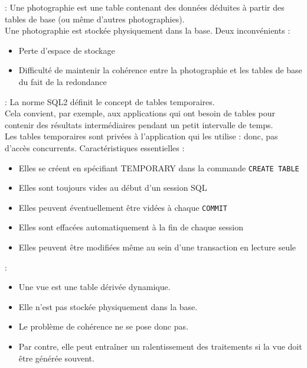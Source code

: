 \documentclass[10pt]{beamer}
\begin{document}
\begin{frame}{\secname : \subsecname}
    Une photographie est une table contenant des données déduites à partir des tables de base (ou même d'autres photographies).\\
    Une photographie est stockée physiquement dans la base.
    Deux inconvénients :
    \begin{itemize}
        \item Perte d'espace de stockage
        \item Difficulté de maintenir la cohérence entre la photographie et les tables de base du fait de la redondance
    \end{itemize}
\end{frame}

\begin{frame}{\secname : \subsecname}
    La norme SQL2 définit le concept de tables temporaires.\\
    Cela convient, par exemple, aux applications qui ont besoin de tables pour contenir des résultats intermédiaires pendant un petit intervalle de temps.\\
    Les tables temporaires sont privées à l'application qui les utilise : donc, pas d'accès concurrents.
    Caractéristiques essentielles :
    \begin{itemize}
        \item Elles se créent en spécifiant TEMPORARY dans la commande \lstinline[language=plsql]!CREATE TABLE!
        \item Elles sont toujours vides au début d'un session SQL
        \item Elles peuvent éventuellement être vidées à chaque \lstinline[language=plsql]!COMMIT!
        \item Elles sont effacées automatiquement à la fin de chaque session
        \item Elles peuvent être modifiées même au sein d'une transaction en lecture seule
    \end{itemize}
\end{frame}

\begin{frame}{\secname : \subsecname}
    \begin{itemize}
        \item Une vue est une table dérivée dynamique.
        \item Elle n'est pas stockée physiquement dans la base.
        \item Le problème de cohérence ne se pose donc pas.
        \item Par contre, elle peut entraîner un ralentissement des traitements si la vue doit être générée souvent.
    \end{itemize}
\end{frame}
\end{document}
